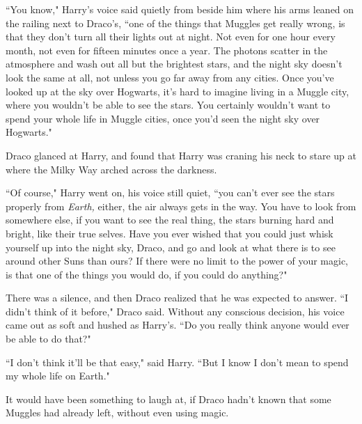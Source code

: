 ``You know," Harry's voice said quietly from beside him where his arms leaned on the railing next to Draco's, ``one of the things that Muggles get really wrong, is that they don't turn all their lights out at night. Not even for one hour every month, not even for fifteen minutes once a year. The photons scatter in the atmosphere and wash out all but the brightest stars, and the night sky doesn't look the same at all, not unless you go far away from any cities. Once you've looked up at the sky over Hogwarts, it's hard to imagine living in a Muggle city, where you wouldn't be able to see the stars. You certainly wouldn't want to spend your whole life in Muggle cities, once you'd seen the night sky over Hogwarts."

Draco glanced at Harry, and found that Harry was craning his neck to stare up at where the Milky Way arched across the darkness.

``Of course," Harry went on, his voice still quiet, ``you can't ever see the stars properly from \emph{Earth,} either, the air always gets in the way. You have to look from somewhere else, if you want to see the real thing, the stars burning hard and bright, like their true selves. Have you ever wished that you could just whisk yourself up into the night sky, Draco, and go and look at what there is to see around other Suns than ours? If there were no limit to the power of your magic, is that one of the things you would do, if you could do anything?"

There was a silence, and then Draco realized that he was expected to answer. ``I didn't think of it before," Draco said. Without any conscious decision, his voice came out as soft and hushed as Harry's. ``Do you really think anyone would ever be able to do that?"

``I don't think it'll be that easy," said Harry. ``But I know I don't mean to spend my whole life on Earth."

It would have been something to laugh at, if Draco hadn't known that some Muggles had already left, without even using magic.

